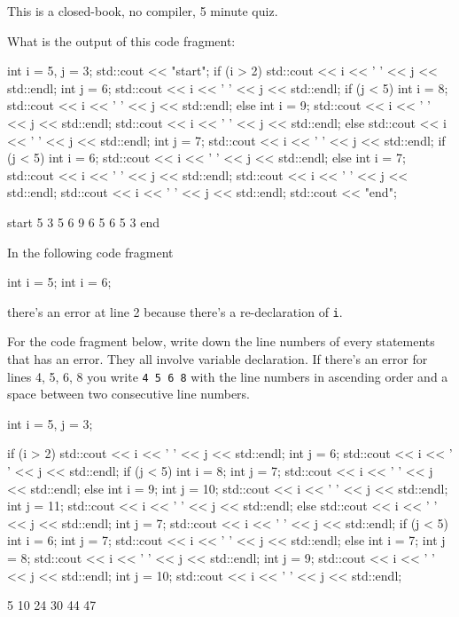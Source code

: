 

This is a closed-book, no compiler, 5 minute quiz.

\nextq
What is the output of this code fragment:
\begin{console}[fontsize=\scriptsize]
int i = 5, j = 3;
std::cout << "start\n";
if (i > 2)
{
    std::cout << i << ' ' << j << std::endl;
    int j = 6;
    std::cout << i << ' ' << j << std::endl;
    if (j < 5)
    {
        int i = 8;
        std::cout << i << ' ' << j << std::endl;
    }
    else
    {
        int i = 9;
        std::cout << i << ' ' << j << std::endl;
    }
    std::cout << i << ' ' << j << std::endl;
}
else
{
    std::cout << i << ' ' << j << std::endl;
    int j = 7;
    std::cout << i << ' ' << j << std::endl;
    if (j < 5)
    {
        int i = 6;
        std::cout << i << ' ' << j << std::endl;
    }
    else
    {
        int i = 7;
        std::cout << i << ' ' << j << std::endl;
    }
    std::cout << i << ' ' << j << std::endl;
}
std::cout << i << ' ' << j << std::endl;
std::cout << "end\n";
\end{console}
\ANSWER
\begin{answercode}
start
5 3
5 6
9 6
5 6
5 3
end
\end{answercode}

\nextq
In the following code fragment
\begin{console}[fontsize=\scriptsize, numbers=left]
int i = 5;
int i = 6;
\end{console}
there's an error at line 2 because there's a re-declaration of \verb!i!.

For the code fragment below,
write down the line numbers of every statements that has an error.
They all involve variable declaration.
If there's an error for lines 4, 5, 6, 8 you write \verb!4 5 6 8!
with the line numbers in ascending order and a space between two consecutive
line numbers.
\begin{console}[fontsize=\scriptsize, numbers=left]
int i = 5, j = 3;

if (i > 2)
{
    std::cout << i << ' ' << j << std::endl;
    int j = 6;
    std::cout << i << ' ' << j << std::endl;
    if (j < 5)
    {
         int i = 8;
         int j = 7;
         std::cout << i << ' ' << j << std::endl;
    }
    else
    {
        int i = 9;
        int j = 10;
        std::cout << i << ' ' << j << std::endl;
    }
    int j = 11;
    std::cout << i << ' ' << j << std::endl;
}
else
{
    std::cout << i << ' ' << j << std::endl;
    int j = 7;
    std::cout << i << ' ' << j << std::endl;
    if (j < 5)
    {
        int i = 6;
        int j = 7;
        std::cout << i << ' ' << j << std::endl;
    }
    else
    {
        int i = 7;
        int j = 8;
        std::cout << i << ' ' << j << std::endl;
    }
    int j = 9;
    std::cout << i << ' ' << j << std::endl;
}
int j = 10;
std::cout << i << ' ' << j << std::endl;
\end{console}
\ANSWER
\begin{answercode}
5 10 24 30 44 47
\end{answercode}


